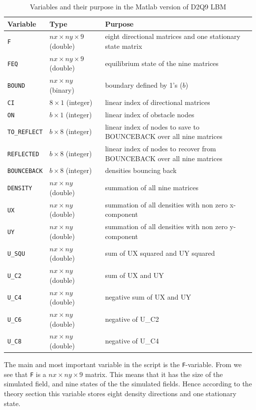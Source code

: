 \begin{table}[htb]
	\centering
	\begin{tabular}{llp{6cm}}
		\toprule
		Variable & Type & Purpose \\
		\midrule
		\texttt{F} 				& $nx\times ny\times 9$ (double)	& eight directional matrices and one stationary state matrix\\
		\texttt{FEQ} 			& $nx\times ny\times 9$ (double)	& equilibrium state of the nine matrices\\

		\texttt{BOUND} 			& $nx\times ny$ (binary) 		& boundary defined by 1's ($b$)\\
		\texttt{CI}				& $8\times 1$ (integer) 			& linear index of directional matrices\\
		\texttt{ON}				& $b\times 1$ (integer)			& linear index of obstacle nodes\\
		\texttt{TO\_REFLECT}		& $b\times 8$ (integer)			& linear index of nodes to save to BOUNCEBACK over all nine matrices\\
		\texttt{REFLECTED} 		& $b\times 8$ (integer) 			& linear index of nodes to recover from BOUNCEBACK over all nine matrices \\
		\texttt{BOUNCEBACK}		& $b\times 8$ (integer) 			& densities bouncing back\\
		\texttt{DENSITY}			& $nx\times ny$ (double) 		& summation of all nine matrices\\
		\texttt{UX}				& $nx\times ny$ (double) 		& summation of all densities with non zero x-component\\
		\texttt{UY}				& $nx\times ny$ (double) 		& summation of all densities with non zero y-component \\
		\texttt{U\_SQU}			& $nx\times ny$ (double) 		& sum of UX squared and UY squared\\
		\texttt{U\_C2}			& $nx\times ny$ (double) 		& sum of UX and UY\\
		\texttt{U\_C4}			& $nx\times ny$ (double) 		& negative sum of UX and UY\\
		\texttt{U\_C6}			& $nx\times ny$ (double) 		& negative of U\_C2\\
		\texttt{U\_C8}			& $nx\times ny$ (double) 		& negative of U\_C4\\
		\bottomrule
	\end{tabular}
	\caption{Variables and their purpose in the Matlab version of D2Q9 LBM}
	\label{matlabvars}
\end{table}

The main and most important variable in the script is the \texttt{F}-variable. From  we see that \texttt{F} is a $nx\times ny\times 9$ matrix. This means that it has the size of the simulated field, and nine states of the the simulated fields. Hence according to the theory section this variable stores eight density directions and one stationary state. 

